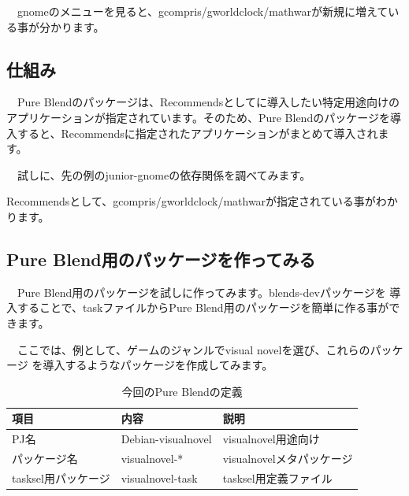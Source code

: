 \documentclass[mingoth,a4paper]{jsarticle}
\begin{document}
　gnomeのメニューを見ると、gcompris/gworldclock/mathwarが新規に増えている事が分かります。

\subsection{仕組み}

　Pure Blendのパッケージは、Recommendsとしてに導入したい特定用途向けのアプリケーションが指定されています。そのため、Pure Blendのパッケージを導入すると、Recommendsに指定されたアプリケーションがまとめて導入されます。

　試しに、先の例のjunior-gnomeの依存関係を調べてみます。

 
 Recommendsとして、gcompris/gworldclock/mathwarが指定されている事がわかります。

\subsection{Pure Blend用のパッケージを作ってみる}

　Pure Blend用のパッケージを試しに作ってみます。blends-devパッケージを
導入することで、taskファイルからPure Blend用のパッケージを簡単に作る事ができます。

　ここでは、例として、ゲームのジャンルでvisual novelを選び、これらのパッケージ
を導入するようなパッケージを作成してみます。

\begin{table}[ht]
\begin{center}
\begin{tabular}{|l|l|p{5cm}|}
\hline 
項目& 内容 & 説明\\ \hline \hline
PJ名 & Debian-visualnovel & visualnovel用途向け \\ \hline 
パッケージ名 & visualnovel-* & visualnovelメタパッケージ \\ \hline 
tasksel用パッケージ & visualnovel-task & tasksel用定義ファイル \\ \hline 
\hline 
\end{tabular}
\label{tab:debian-visualnovel}
\caption{今回のPure Blendの定義}
\end{center}
\end{table}
\end{document}
